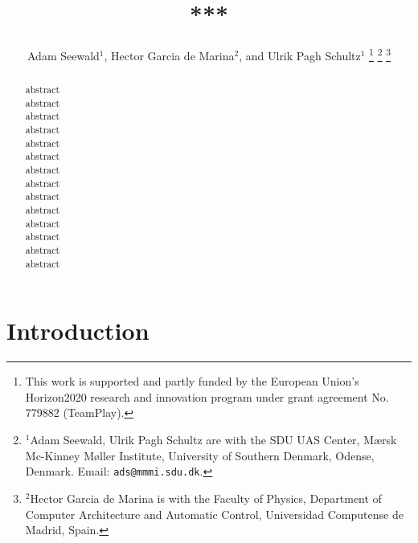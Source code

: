 \documentclass[letterpaper,10pt,conference]{ieeeconf}
\title{\LARGE \bf
***
}
\author{
  Adam Seewald$^{1}$, Hector Garcia de Marina$^{2}$, and Ulrik Pagh Schultz$^{1}$
  \thanks{This work is supported and partly funded by the European Union's Horizon2020 research and innovation program under grant agreement No. 779882 (TeamPlay).
  }
  \thanks{$^{1}$Adam Seewald, Ulrik Pagh Schultz are with the SDU UAS Center, M{\ae}rsk Mc-Kinney M{\o}ller Institute, University of Southern Denmark, Odense, Denmark. Email: {\tt\small ads@mmmi.sdu.dk}.}
  \thanks{$^{2}$Hector Garcia de Marina is with the Faculty of Physics, Department of Computer Architecture and Automatic Control, Universidad Computense de Madrid, Spain.}
}
\begin{document}
\maketitle

\thispagestyle{empty}
\pagestyle{empty}

\begin{abstract}

  abstract\\
  abstract\\
  abstract\\
  abstract\\
  abstract\\
  abstract\\
  abstract\\
  abstract\\
  abstract\\
  abstract\\
  abstract\\
  abstract\\
  abstract\\
  abstract
\end{abstract}

%
\IEEEpeerreviewmaketitle


\section{Introduction}
\label{sec:intro}

\end{document}
